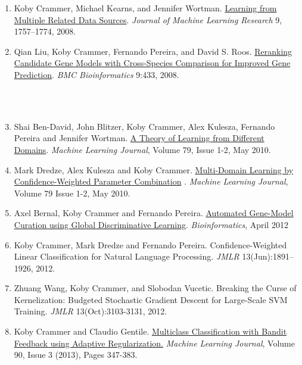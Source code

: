 \documentclass{resume}
\newcommand{\technion}{~Position at TECHNION~}
\begin{document}
\begin{enumerate}
\item
{Koby Crammer}, Michael Kearns, and Jennifer Wortman.
\href{http://jmlr.csail.mit.edu/papers/v9/crammer08a.html}
{Learning from Multiple Related Data Sources}.  {\em Journal of Machine
Learning Research} 9, 1757--1774, 2008.

\item
Qian Liu, {Koby Crammer}, Fernando Pereira, and David S. Roos.
\href{http://www.biomedcentral.com/1471-2105/9/433}
{Reranking Candidate Gene Models with Cross-Species Comparison for Improved Gene Prediction}.  {\em BMC Bioinformatics} 9:433, 2008.
\\~\\\centerline{\hrulefill\raisebox{-0.5\ht1}{\technion}\hrulefill}\\

\item
Shai Ben-David, John Blitzer, {Koby Crammer}, Alex Kulesza, Fernando Pereira and Jennifer Wortman.
\href{http://www.springerlink.com/content/q6qk230685577n52/}{A Theory of Learning from Different Domains}.
{\em Machine Learning Journal}, Volume 79, Issue 1-2, May 2010.

\item
Mark Dredze, Alex Kulesza and {Koby Crammer}.
\href{http://www.springerlink.com/content/a78049767680386l/}{Multi-Domain Learning by Confidence-Weighted Parameter Combination} .
{\em Machine Learning Journal}, Volume 79 Issue 1-2, May 2010.

\item
Axel Bernal, Koby Crammer and Fernando Pereira.
\href{http://bioinformatics.oxfordjournals.org/content/early/2012/04/17/bioinformatics.bts176.full.pdf+html}{Automated Gene-Model Curation using Global Discriminative Learning}.
{\em Bioinformatics}, April 2012

\item
{Koby Crammer}, Mark Dredze and Fernando Pereira.
Confidence-Weighted Linear Classification for Natural Language
Processing.
{\em JMLR} 13(Jun):1891--1926, 2012. 

\item
Zhuang Wang, {Koby Crammer}, and Slobodan Vucetic.
Breaking the Curse of Kernelization: Budgeted Stochastic Gradient
Descent for Large-Scale SVM Training.
{\em JMLR} 13(Oct):3103-3131, 2012.


\item
{Koby Crammer} and Claudio Gentile.
\href{http://www.springer.com/home?SGWID=0-0-1003-0-0&aqId=2406203&download=1&checkval=951b947939b069f46cb63e1f6ee72695}{Multiclass Classification with Bandit Feedback using Adaptive
Regularization.}
{\em Machine Learning Journal},  Volume 90, Issue 3 (2013), Pages 347-383.



\end{enumerate}
\end{document}
